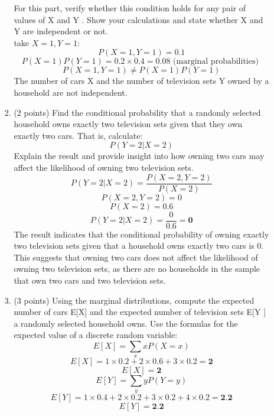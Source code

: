 \documentclass[a3paper,12pt]{article} %
\begin{document}
\begin{enumerate}
\begin{enumerate}
\begin{enumerate}
\[        \]
        For this part, verify whether this condition holds for any pair of values of X and Y . Show
        your calculations and state whether X and Y are independent or not.
        \\ take \(X = 1, Y = 1\):
        \[
            P(X = 1, Y = 1) = 0.1
        \]
        \[
            P(X = 1)P(Y = 1) = 0.2 \times 0.4 = 0.08 \text{ (marginal probabilities) }
        \]
        \[
            P(X = 1, Y = 1) \neq P(X = 1)P(Y = 1)
        \]
        The number of cars X and the number of television sets Y owned by a household are not independent.
        \item (2 points) Find the conditional probability that a randomly selected household owns
        exactly two television sets given that they own exactly two cars. That is, calculate:
        \[
            P(Y = 2 |X = 2)
        \]
        Explain the result and provide insight into how owning two cars may affect the likelihood of
        owning two television sets.
        \[
            P(Y = 2 |X = 2) = \frac{P(X = 2, Y = 2)}{P(X = 2)}
        \]
        \[
            P(X = 2, Y = 2) = 0
        \]
        \[
            P(X = 2) = 0.6
        \]
        \[
            P(Y = 2 |X = 2) = \frac{0}{0.6} = \textbf{0}
        \]
        The result indicates that the conditional probability of owning exactly two television sets given that a household owns exactly two cars is 0. This suggests that owning two cars does not affect the likelihood of owning two television sets, as there are no households in the sample that own two cars and two television sets.
        \item (3 points) Using the marginal distributions, compute the expected number of cars E[X]
        and the expected number of television sets E[Y ] a randomly selected household owns. Use
        the formulas for the expected value of a discrete random variable:
        \[
            E[X] = \sum_{x} xP(X = x)
        \]
        \[
            E[X] = 1 \times 0.2 + 2 \times 0.6 + 3 \times 0.2 = \textbf{2}
        \]
        \[
            E[X] = \textbf{2}
        \]
        \[
            E[Y] = \sum_{y} yP(Y = y)
        \]
        \[
            E[Y] = 1 \times 0.4 + 2 \times 0.2 + 3 \times 0.2 + 4 \times 0.2 = \textbf{2.2}
        \]
        \[
            E[Y] = \textbf{2.2}
        \]


\end{enumerate}
\end{enumerate}
\end{enumerate}
\end{document}
